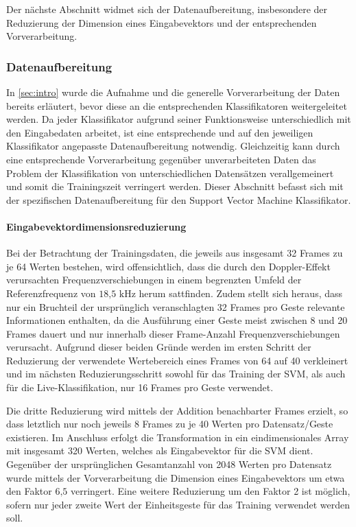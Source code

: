 Der nächste Abschnitt widmet sich der Datenaufbereitung, insbesondere der Reduzierung der Dimension eines Eingabevektors und der entsprechenden Vorverarbeitung.

\subsubsection{Datenaufbereitung}\label{sec:svm_data} 
In \autoref{sec:intro} wurde die Aufnahme und die generelle Vorverarbeitung der Daten bereits erläutert, bevor diese an die entsprechenden Klassifikatoren weitergeleitet werden.
Da jeder Klassifikator aufgrund seiner Funktionsweise unterschiedlich mit den Eingabedaten arbeitet, ist eine entsprechende und auf den jeweiligen Klassifikator angepasste Datenaufbereitung notwendig.
Gleichzeitig kann durch eine entsprechende Vorverarbeitung gegenüber unverarbeiteten Daten das Problem der Klassifikation von unterschiedlichen Datensätzen verallgemeinert und somit die Trainingszeit verringert werden.
Dieser Abschnitt befasst sich mit der spezifischen Datenaufbereitung für den Support Vector Machine Klassifikator.

\paragraph{Eingabevektordimensionsreduzierung}\label{sec:svm_reduce}$\;$ \\
Bei der Betrachtung der Trainingsdaten, die jeweils aus insgesamt 32 Frames zu je 64 Werten bestehen, wird offensichtlich, dass die durch den Doppler-Effekt verursachten Frequenzverschiebungen in einem begrenzten Umfeld der Referenzfrequenz von $18\text{,}5\text{ kHz}$ herum sattfinden.
Zudem stellt sich heraus, dass nur ein Bruchteil der ursprünglich veranschlagten 32 Frames pro Geste relevante Informationen enthalten, da die Ausführung einer Geste meist zwischen 8 und 20 Frames dauert und nur innerhalb dieser Frame-Anzahl Frequenzverschiebungen verursacht.
Aufgrund dieser beiden Gründe werden im ersten Schritt der Reduzierung der verwendete Wertebereich eines Frames von 64 auf 40 verkleinert und im nächsten Reduzierungsschritt sowohl für das Training der \ac{SVM}, als auch für die Live-Klassifikation, nur 16 Frames pro Geste verwendet. 

Die dritte Reduzierung wird mittels der Addition benachbarter Frames erzielt, so dass letztlich nur noch jeweils 8 Frames zu je 40 Werten pro Datensatz/Geste existieren.
Im Anschluss erfolgt die Transformation in ein eindimensionales Array mit insgesamt 320 Werten, welches als Eingabevektor für die \ac{SVM} dient.
Gegenüber der ursprünglichen Gesamtanzahl von 2048 Werten pro Datensatz wurde mittels der Vorverarbeitung die Dimension eines Eingabevektors um etwa den Faktor $6\text{,}5$ verringert.
Eine weitere Reduzierung um den Faktor 2 ist möglich, sofern nur jeder zweite Wert der Einheitsgeste für das Training verwendet werden soll.

